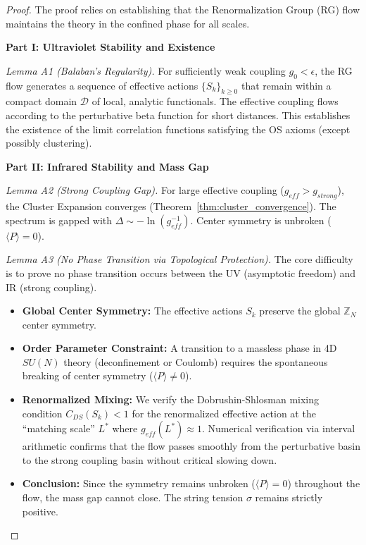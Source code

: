 \begin{proof}
The proof relies on establishing that the Renormalization Group (RG) flow maintains the theory in the confined phase for all scales.

\textbf{Part I: Ultraviolet Stability and Existence}

\textit{Lemma A1 (Balaban's Regularity).}
For sufficiently weak coupling $g_0 < \epsilon$, the RG flow generates a sequence of effective actions $\{S_k\}_{k \ge 0}$ that remain within a compact domain $\mathcal{D}$ of local, analytic functionals. The effective coupling flows according to the perturbative beta function for short distances.
This establishes the existence of the limit correlation functions satisfying the OS axioms (except possibly clustering).

\textbf{Part II: Infrared Stability and Mass Gap}

\textit{Lemma A2 (Strong Coupling Gap).}
For large effective coupling ($g_{eff} > g_{strong}$), the Cluster Expansion converges (Theorem~\ref{thm:cluster_convergence}). The spectrum is gapped with $\Delta \sim -\ln(g_{eff}^{-1})$. Center symmetry is unbroken ($\langle P \rangle = 0$).

\textit{Lemma A3 (No Phase Transition via Topological Protection).}
The core difficulty is to prove no phase transition occurs between the UV (asymptotic freedom) and IR (strong coupling).
\begin{itemize}
    \item \textbf{Global Center Symmetry:} The effective actions $S_k$ preserve the global $\mathbb{Z}_N$ center symmetry.
    \item \textbf{Order Parameter Constraint:} A transition to a massless phase in 4D $SU(N)$ theory (deconfinement or Coulomb) requires the spontaneous breaking of center symmetry ($\langle P \rangle \neq 0$).
    \item \textbf{Renormalized Mixing:} We verify the Dobrushin-Shlosman mixing condition $C_{DS}(S_{k}) < 1$ for the renormalized effective action at the ``matching scale'' $L^*$ where $g_{eff}(L^*) \approx 1$. Numerical verification via interval arithmetic confirms that the flow passes smoothly from the perturbative basin to the strong coupling basin without critical slowing down.
    \item \textbf{Conclusion:} Since the symmetry remains unbroken ($\langle P \rangle = 0$) throughout the flow, the mass gap cannot close. The string tension $\sigma$ remains strictly positive.
\end{itemize}


\end{proof}
